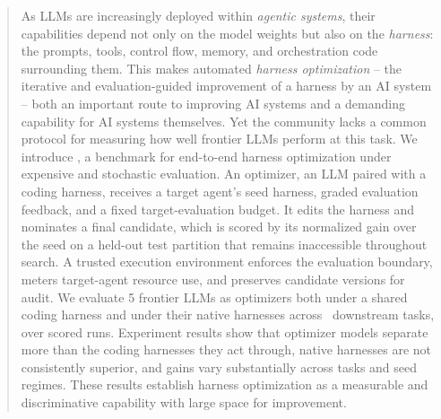 \begin{abstract}
As LLMs are increasingly deployed within \emph{agentic systems}, their capabilities depend not only on the model weights but also on the \emph{harness}: the prompts, tools, control flow, memory, and orchestration code surrounding them. This makes automated \emph{harness optimization} -- the iterative and evaluation-guided improvement of a harness by an AI system -- both an important route to improving AI systems and a demanding capability for AI systems themselves. Yet the community lacks a common protocol for measuring how well frontier LLMs perform at this task. We introduce \heb, a benchmark for end-to-end
harness optimization under expensive and stochastic evaluation. An
optimizer, an LLM paired with a coding harness, receives a
target agent's seed harness, graded evaluation feedback,
and a fixed target-evaluation budget. It edits the harness and nominates
a final candidate, which is scored by its normalized gain over the seed
on a held-out test partition that remains inaccessible throughout
search. A trusted execution environment enforces the evaluation
boundary, meters target-agent resource use, and preserves candidate
versions for audit. We evaluate 5 frontier LLMs as optimizers both under a shared coding harness
and under their native harnesses across
\NumPaperTasks\ downstream tasks, over \NumScoredCells scored runs. Experiment results show that optimizer
models separate more than the coding harnesses they act through, native
harnesses are not consistently superior, and gains vary substantially across tasks and seed regimes. These results establish harness optimization as a measurable and discriminative capability with large space for improvement.

\end{abstract}